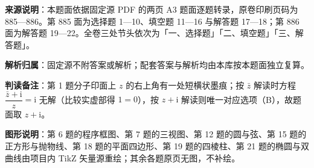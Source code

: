 

\begin{gknotice}
\textbf{来源说明}：本题面依据固定源 PDF 的两页 A3 题面逐题转录，原卷印刷页码为 885—886。第 885 面为选择题 1—10、填空题 11—16 与解答题 17—18；第 886 面为解答题 19—22。全卷三处节头依次为「一、选择题」「二、填空题」「三、解答题」。

\textbf{解析归属}：固定源不附答案或解析；配套答案与解析均由本库按本题面独立复算。

\textbf{判读备注}：第 1 题分子印面上 $z$ 的右上角有一处短横状墨痕；按 $\bar z$ 解读时方程 $\dfrac{\bar z+\mathrm i}{z}=\mathrm i$ 无解（比较实虚部得 $1=0$），按 $z+\mathrm i$ 解读则唯一对应选项（B），故题面取 $z+\mathrm i$。

\textbf{图形说明}：第 6 题的程序框图、第 7 题的三视图、第 12 题的圆与弦、第 15 题的正方形与抛物线、第 18 题的平面四边形、第 19 题的四棱柱、第 21 题的椭圆与双曲线由项目内 TikZ 矢量源重绘；其余各题原页无图，不补绘。
\end{gknotice}


